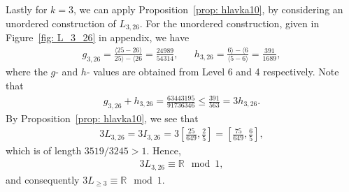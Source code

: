 \documentclass{ws-ijnt}
\begin{document}
	Lastly for $k=3$, we can apply Proposition~\ref{prop: hlavka10}, by considering an unordered construction of $L_{3,26}$. For the unordered construction, given in Figure~\ref{fig: L_3_26} in appendix, we have
	\begin{align*}
		g_{3,26}
		=\frac{\langle25-26\rangle}{25\rangle-\langle26}
		=\frac{24989}{54314}, &&
		h_{3,26}
		=\frac{6\rangle-\langle6}{\langle5-6\rangle}
		= \frac{391}{1689},
	\end{align*}
	where the $g$- and $h$- values are obtained from Level 6 and 4 respectively. Note that
	\begin{align*}
		g_{3,26}+h_{3,26}
		= \frac{63443195}{91736346}
		\leq
		\frac{391}{563}
		= 3 h_{3,26}.
	\end{align*}
	By Proposition~\ref{prop: hlavka10}, we see that
	\begin{align*}
		3 L_{3,26}
		= 3 I_{3,26}
		= 3\left[\frac{25}{649}, \frac{2}{5}\right]
		= \left[\frac{75}{649}, \frac{6}{5}\right]
		,
	\end{align*}
	which is of length ${3519}/{3245}> 1$. Hence,
	\begin{align*}
		3 L_{3,26} \equiv \mathbb{R} \mod 1,
	\end{align*}
	and consequently $3 L_{\geq 3} \equiv \mathbb{R} \mod 1$.
	
\end{document}
